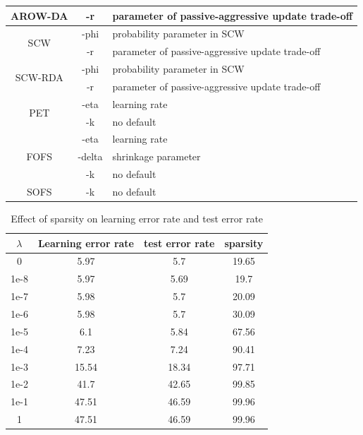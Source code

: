 \documentclass[11pt,a4paper]{article}
\begin{document}
\begin{table}[!t]
\begin{tabular}{|c|c|p{9cm}|}
                AROW-DA& -r  &parameter of passive-aggressive update trade-off\\
                \hline
                \multirow{2}{*}{SCW}& -phi & probability parameter in SCW\\
                \cline{2-3}
                & -r & parameter of passive-aggressive update trade-off\\
                \hline
                \multirow{2}{*}{SCW-RDA}& -phi & probability parameter in SCW\\
                \cline{2-3}
                & -r & parameter of passive-aggressive update trade-off\\
                \hline
                \multirow{2}{*}{PET}& -eta & learning rate\\
                \cline{2-3}
                & -k& no default\\
                \hline
                \multirow{3}{*}{FOFS}& -eta & learning rate\\
                \cline{2-3}
                & -delta & shrinkage parameter\\
                \cline{2-3}
                & -k& no default\\
                \hline
                SOFS & -k & no default\\ \hline

            \end{tabular}
        \end{table}

\begin{table}[!h]
    \label{tbl:lambda_effect}
    \centering
    \begin{tabular}{|c|c|c|c|}
        \hline
        $\lambda$ & Learning error rate & test error rate & sparsity \\
        \hline
        0 & 5.97 & 5.7 & 19.65 \\
        1e-8 & 5.97 & 5.69 & 19.7 \\
        1e-7 & 5.98 & 5.7 & 20.09 \\
        1e-6 & 5.98 & 5.7 & 30.09 \\
        1e-5 & 6.1 & 5.84 & 67.56 \\
        1e-4 & 7.23 & 7.24 & 90.41 \\
        1e-3 & 15.54 & 18.34 & 97.71 \\
        1e-2 & 41.7 & 42.65 & 99.85\\
        1e-1 & 47.51 & 46.59 & 99.96 \\
        1 & 47.51 & 46.59 & 99.96 \\
        \hline
    \end{tabular}
    \caption{Effect of sparsity on learning error rate and test error rate}
    \label{tab:effect_lambda}
\end{table}
\end{document}
